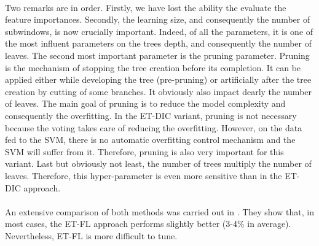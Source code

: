 \documentclass[a4paper]{report}
\begin{document}
		\paragraph{}
		Two remarks are in order. Firstly, we have lost the ability the evaluate the feature importances. Secondly, the learning size, and consequently the number of subwindows, is now crucially important. Indeed, of all the parameters, it is one of the most influent parameters on the trees depth, and consequently the number of leaves. 
		The second most important parameter is the pruning parameter. Pruning is the mechanism of stopping the tree creation before its completion. It can be applied either while developing the tree (pre-pruning) or artificially after the tree creation by cutting of some branches. It obviously also impact dearly the number of leaves. The main goal of pruning is to reduce the model complexity and consequently the overfitting. In the ET-DIC variant, pruning is not necessary because the voting takes care of reducing the overfitting. However, on the data fed to the SVM, there is no automatic overfitting control mechanism and the SVM will suffer from it. Therefore, pruning is also very important for this variant.
		Last but obviously not least, the number of trees multiply the number of leaves. Therefore, this hyper-parameter is even more sensitive than in the ET-DIC approach.
		\paragraph{}
		An extensive comparison of both methods was carried out in \cite{}. They show that, in most cases, the ET-FL approach performs slightly better (3-4\% in average). Nevertheless, ET-FL is more difficult to tune. 
			
\end{document}
